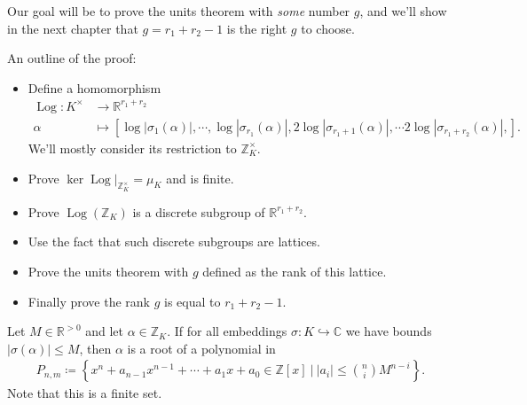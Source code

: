 \begin{remark}

Our goal will be to prove the units theorem with \emph{some} number
\(g\), and we'll show in the next chapter that \(g = r_1 + r_2 - 1\) is
the right \(g\) to choose.

An outline of the proof:

\begin{itemize}
\item
  Define a homomorphism
  \begin{align*}
  \operatorname{Log}: K^{\times}&\to {\mathbb{R}}^{r_1 + r_2} \\
  \alpha &\mapsto {\left[ { 
  \log{\left\lvert {\sigma_1( \alpha) } \right\rvert}, 
  \cdots,
  \log{\left\lvert {\sigma_{r_1}( \alpha) } \right\rvert}, 
  2\log{\left\lvert {\sigma_{r_1+1}( \alpha) } \right\rvert}, 
  \cdots
  2\log{\left\lvert {\sigma_{r_1+r_2}( \alpha) } \right\rvert}, 
  } \right]}
  .\end{align*}
  We'll mostly consider its restriction to \({\mathbb{Z}}_K^{\times}\).
\item
  Prove
  \(\ker { \left.{{\operatorname{Log}}} \right|_{{{\mathbb{Z}}_K^{\times}}} } = \mu_K\)
  and is finite.
\item
  Prove \(\operatorname{Log}({\mathbb{Z}}_K)\) is a discrete subgroup of
  \({\mathbb{R}}^{r_1 + r_2}\).
\item
  Use the fact that such discrete subgroups are lattices.
\item
  Prove the units theorem with \(g\) defined as the rank of this
  lattice.
\item
  Finally prove the rank \(g\) is equal to \(r_1 + r_2 - 1\).
\end{itemize}

\end{remark}

\begin{lemma}[?]

Let \(M\in {\mathbb{R}}^{>0}\) and let \(\alpha \in {\mathbb{Z}}_K\). If
for all embeddings \(\sigma: K\hookrightarrow{\mathbb{C}}\) we have
bounds \({\left\lvert {\sigma( \alpha)} \right\rvert} \leq M\), then
\(\alpha\) is a root of a polynomial in
\begin{align*}
P_{n,m}
\coloneqq
\left\{{ x^n + a_{n-1} x^{n-1} + \cdots + a_1 x + a_0 \in {\mathbb{Z}}[x] {~\mathrel{\Big|}~}{\left\lvert {a_i} \right\rvert} \leq {n\choose i} M^{n-i} }\right\} 
.\end{align*}
Note that this is a finite set.

\end{lemma}

